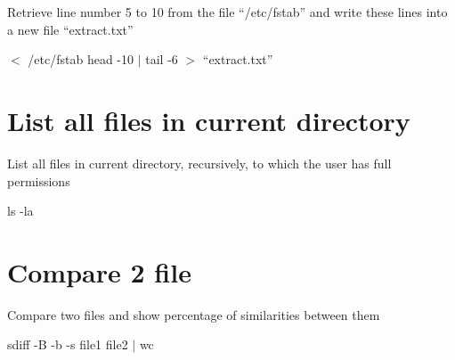 \documentclass[article, paper=a4, fontsize=11pt]{scrartcl}
\begin{document}
Retrieve line number 5 to 10 from the file “/etc/fstab” and
write these lines into a new file “extract.txt”

$<$ /etc/fstab head -10 $\mid$ tail -6 $>$ “extract.txt”

\section{List all files in current directory}

List all files in current directory, recursively, to which the user has full permissions

ls -la

\section{Compare 2 file}

Compare two files and show percentage of similarities between them

sdiff -B -b -s file1 file2 $\mid$ wc
\end{document}
